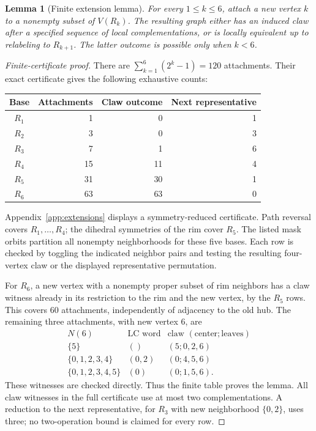 \documentclass[11pt,letterpaper]{article}
\newtheorem{lemma}[theorem]{Lemma}
\begin{document}
\begin{lemma}[Finite extension lemma]\label{lem:extension}
For every $1\leq k\leq6$, attach a new vertex $k$ to a nonempty subset of $V(R_k)$. The resulting graph either has an induced claw after a specified sequence of local complementations, or is locally equivalent up to relabeling to $R_{k+1}$. The latter outcome is possible only when $k<6$.
\end{lemma}
\begin{proof}[Finite-certificate proof]
There are $\sum_{k=1}^6(2^k-1)=120$ attachments. Their exact certificate gives the following exhaustive counts:
\begin{center}
\begin{tabular}{@{}crrr@{}}
\toprule
Base&Attachments&Claw outcome&Next representative\\\midrule
$R_1$&1&0&1\\
$R_2$&3&0&3\\
$R_3$&7&1&6\\
$R_4$&15&11&4\\
$R_5$&31&30&1\\
$R_6$&63&63&0\\\bottomrule
\end{tabular}
\end{center}
Appendix~\ref{app:extensions} displays a symmetry-reduced certificate. Path reversal covers $R_1,\ldots,R_4$; the dihedral symmetries of the rim cover $R_5$. The listed mask orbits partition all nonempty neighborhoods for these five bases. Each row is checked by toggling the indicated neighbor pairs and testing the resulting four-vertex claw or the displayed representative permutation.

For $R_6$, a new vertex with a nonempty proper subset of rim neighbors has a claw witness already in its restriction to the rim and the new vertex, by the $R_5$ rows. This covers $60$ attachments, independently of adjacency to the old hub. The remaining three attachments, with new vertex $6$, are
\[
\begin{array}{c|c|c}
N(6)&\text{LC word}&\text{claw }(\text{center};\text{leaves})\\\hline
\{5\}&()&(5;0,2,6)\\
\{0,1,2,3,4\}&(0,2)&(0;4,5,6)\\
\{0,1,2,3,4,5\}&(0)&(0;1,5,6).
\end{array}
\]
These witnesses are checked directly. Thus the finite table proves the lemma. All claw witnesses in the full certificate use at most two complementations. A reduction to the next representative, for $R_3$ with new neighborhood $\{0,2\}$, uses three; no two-operation bound is claimed for every row.
\end{proof}
\end{document}
